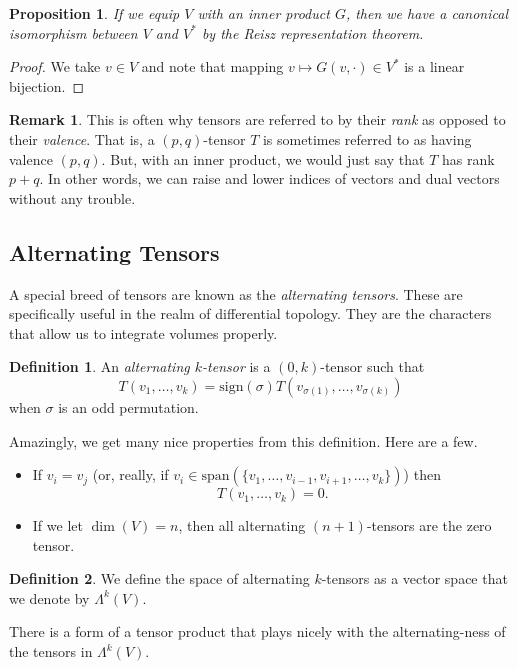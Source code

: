 \documentclass[12pt]{article}
\newcommand{\sign}{\mathrm{sign}}
\newtheorem{proposition}{Proposition}[section]
\theoremstyle{definition}
\newtheorem{definition}{Definition}[section]
\newtheorem{remark}{Remark}[section]
\begin{document}
\begin{proposition}
If we equip $V$ with an inner product $G$, then we have a canonical isomorphism between $V$ and $V^*$ by the Reisz representation theorem. 
\end{proposition}

\begin{proof}
We take $v\in V$ and note that mapping $v\mapsto G(v,\cdot)\in V^*$ is a linear bijection.  
\end{proof}

\begin{remark}
This is often why tensors are referred to by their \emph{rank} as opposed to their \emph{valence}.  That is, a $(p,q)$-tensor $T$ is sometimes referred to as having valence $(p,q)$.  But, with an inner product, we would just say that $T$ has rank $p+q$. In other words, we can raise and lower indices of vectors and dual vectors without any trouble.
\end{remark}

\subsection{Alternating Tensors}
A special breed of tensors are known as the \emph{alternating tensors}. These are specifically useful in the realm of differential topology.  They are the characters that allow us to integrate volumes properly.  
\begin{definition}
An \emph{alternating $k$-tensor} is a $(0,k)$-tensor such that
\[
T(v_1,\dots,v_k)=\sign(\sigma)T(v_{\sigma(1)},\dots,v_{\sigma(k)})
\]
when $\sigma$ is an odd permutation. 
\end{definition}

Amazingly, we get many nice properties from this definition.  Here are a few.
\begin{itemize}
    \item If $v_i=v_j$ (or, really, if $v_i\in \textrm{span}\left(\{v_1,\dots,v_{i-1},v_{i+1},\dots,v_{k}\}\right)$) then
    \[
    T(v_1,\dots,v_k)=0.
    \]
    \item If we let $\dim(V)=n$, then all alternating $(n+1)$-tensors are the zero tensor.
\end{itemize}

\begin{definition}
We define the space of alternating $k$-tensors as a vector space that we denote by $\Lambda^k(V)$.
\end{definition}

There is a form of a tensor product that plays nicely with the alternating-ness of the tensors in $\Lambda^k(V)$.  
\end{document}
